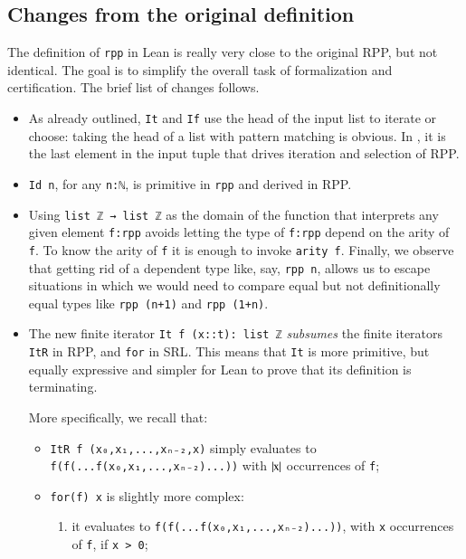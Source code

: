 \documentclass[preprint]{elsarticle}
\theoremstyle{remark}
\newcommand{\RPP}{\textsf{RPP}\xspace}
\newcommand{\LEAN}{\textsf{Lean}\xspace}
\newcommand{\SRL}{\textsf{SRL}\xspace}
\begin{document}
\subsection{Changes from the original definition}
The definition of \lstinline|rpp| in \LEAN is really very close to the original \RPP, but not identical. The goal is to simplify the overall task of formalization and certification. The brief list of changes follows.
\begin{itemize}
    \item As already outlined, \lstinline|It| and \lstinline|If| use the head of the input list to iterate or choose: taking the head of a list with pattern matching is obvious. In \cite{DBLP:journals/tcs/PaoliniPR20}, it is the last element in the input tuple that drives iteration and selection of \RPP.

    \item \lstinline|Id n|, for any \lstinline|n:ℕ|, is primitive in \lstinline|rpp| and derived in \RPP.

    \item Using \lstinline|list ℤ → list ℤ| as the domain of the function that interprets any given element \lstinline|f:rpp| avoids  letting the type of \lstinline|f:rpp| depend on the arity of \lstinline|f|. To know the arity of \lstinline|f| it is enough to invoke \lstinline|arity f|. Finally, we observe that getting rid of a dependent type like, say, \lstinline|rpp n|, allows us to escape situations in which we would need to compare equal but not definitionally equal types like \lstinline|rpp (n+1)| and \lstinline|rpp (1+n)|.

    \item The new finite iterator \lstinline|It f (x::t): list ℤ| \emph{subsumes} the finite iterators \lstinline|ItR| in \RPP, and \lstinline|for| in \SRL. This means that \lstinline|It| is more primitive, but equally expressive and simpler for \LEAN to prove that its definition is terminating.

    More specifically, we recall that:
    \begin{itemize}
        \item \lstinline|ItR f (x₀,x₁,...,xₙ₋₂,x)| simply evaluates to \lstinline|f(f(...f(x₀,x₁,...,xₙ₋₂)...))| with $ \mid\!\!\mbox{\lstinline|x|}\!\!\mid $ occurrences of \lstinline|f|;

        \item \lstinline|for(f) x| is slightly more complex:
        \begin{enumerate}
            \item it evaluates to \lstinline|f(f(...f(x₀,x₁,...,xₙ₋₂)...))|, with \lstinline|x| occurrences of \lstinline|f|, if \lstinline|x > 0|;


\end{enumerate}
\end{itemize}
\end{itemize}
\end{document}
